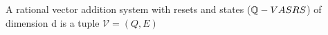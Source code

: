 
\begin{mydef}
A rational vector addition system with resets and states ($\mathbb{Q}-VASRS$) of dimension d is a tuple $\mathcal{V} = (Q, E)$
\end{mydef}